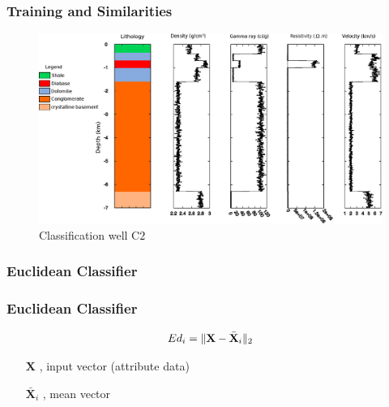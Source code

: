 \documentclass[aspectratio=10]{beamer} %
\begin{document}
\begin{frame}
\frametitle{Training and Similarities}
\begin{figure}[H]
	\centering
	\includegraphics[scale=0.39]{Imagens/Pococ2.eps}
	\caption{Classification well C$2$}
	\label{C2}
\end{figure}
\end{frame}



\subsubsection{Euclidean Classifier}

\begin{frame}
	\frametitle{Euclidean Classifier}
		\begin{tcolorbox}[colback=gray!5,colframe=blue!40!black,title=Definition]
	\begin{equation}
	Ed_{i} =  \Arrowvert \textbf{X}-\bar{\textbf{X}}_{i}  \Arrowvert_{2} \nonumber
	\label{eq4}
	\end{equation}  
\end{tcolorbox}
	 \pause
	\begin{itemize}
		\centering
		\item[$\textbf{X}$], input vector (attribute data)
		\pause
		\item[$\bar{\textbf{X}}_{i}$], mean vector
	\end{itemize}
	
\end{frame}
  
\end{document}
